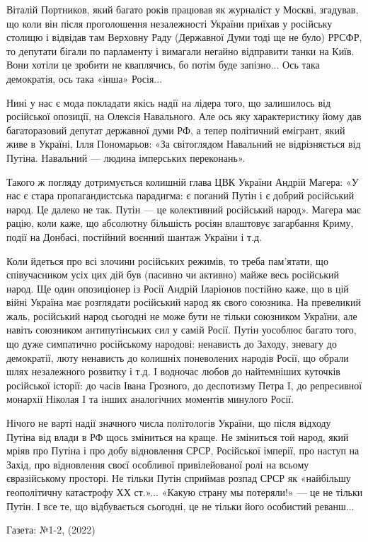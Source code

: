 Віталій Портников, який багато років працював як журналіст у Москві, згадував,
що коли він після проголошення незалежності України приїхав у російську столицю
і відвідав там Верховну Раду (Державної Думи тоді ще не було) РРСФР, то
депутати бігали по парламенту і вимагали негайно відправити танки на Київ. Вони
хотіли це зробити не кваплячись, бо потім буде запізно... Ось така демократія,
ось така «інша» Росія...

Нині у нас є мода покладати якісь надії на лідера того, що залишилось від
російської опозиції, на Олексія Навального. Але ось яку характеристику йому дав
багаторазовий депутат державної думи РФ, а тепер політичний емігрант, який живе
в Україні, Ілля Пономарьов: «За світоглядом Навальний не відрізняється від
Путіна. Навальний — людина імперських переконань».

Такого ж погляду дотримується колишній глава ЦВК України Андрій Магера: «У нас
є стара пропагандистська парадигма: є поганий Путін і є добрий російський
народ. Це далеко не так. Путін — це колективний російський народ». Магера має
рацію, коли каже, що абсолютну більшість росіян влаштовує загарбання Криму,
події на Донбасі, постійний воєнний шантаж України і т.д.

Коли йдеться про всі злочини російських режимів, то треба пам’ятати, що
співучасником усіх цих дій був (пасивно чи активно) майже весь російський
народ. Ще один опозиціонер із Росії Андрій Іларіонов постійно каже, що в цій
війні Україна має розглядати російський народ як свого союзника. На превеликий
жаль, російський народ сьогодні не може бути не тільки союзником України, але
навіть союзником антипутінських сил у самій Росії. Путін уособлює багато того,
що дуже симпатично російському народові: ненависть до Заходу, зневагу до
демократії, люту ненависть до колишніх поневолених народів Росії, що  обрали
шлях незалежного розвитку і т.д. І водночас любов до найтемніших куточків
російської історії: до часів Івана Грозного, до деспотизму Петра I, до
репресивної монархії Ніколая I та інших аналогічних моментів минулого Росії.

Нічого не варті надії значного числа політологів України, що після відходу
Путіна від влади в РФ щось зміниться на краще. Не зміниться той народ, який
мріяв про Путіна і про добу відновлення СРСР, Російської імперії, про наступ на
Захід, про відновлення своєї особливої привілейованої ролі на всьому
євразійському просторі. Не тільки Путін сприймав розпад СРСР як «найбільшу
геополітичну катастрофу ХХ ст.»... «Какую страну мы потеряли!» — це не тільки
Путін. І все те, що відбувається сьогодні, це не тільки його особистий
реванш...  

Газета: №1-2, (2022)
